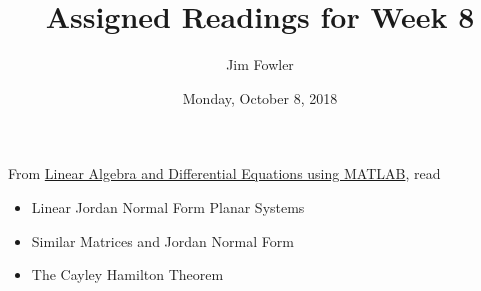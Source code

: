 \documentclass{homework}
\author{Jim Fowler}
\title{Assigned Readings for Week 8}
\date{Monday, October 8, 2018}
\begin{document}
\maketitle

From \href{/courses/43735/files/folder/textbooks}{Linear Algebra and Differential Equations using MATLAB}, read 
\begin{itemize}
\item {} Linear Jordan Normal Form Planar Systems
\item {} Similar Matrices and Jordan Normal Form
\item {} The Cayley Hamilton Theorem
\end{itemize}
\end{document}
